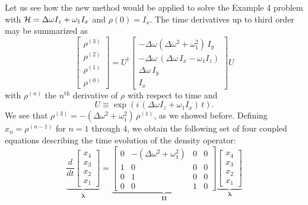 Let us see how the new method would be applied to solve the Example 4 problem with ${\cal H} = \Delta \omega I_z + \omega_1 I_x$ and $\rho(0) = I_x$.  The time derivatives up to third order may be summarized as
\begin{equation}
\begin{bmatrix}
	\rho^{(3)} \\
	\rho^{(2)} \\
	\rho^{(1)} \\
	\rho^{(0)} 
\end{bmatrix}
=
U^{\dagger}
\begin{bmatrix}
	- \Delta\omega (\Delta\omega^2 + \omega_1^2) \, I_y \\
	-\Delta\omega \, (\Delta\omega \, I_x - \omega_1 I_z)  \\
	\Delta \omega \, I_y \\
	I_x 
\end{bmatrix}
U
\end{equation}
with $\rho^{(n)}$ the $n^{\text{th}}$ derivative of $\rho$ with respect to time and
\begin{equation}
U \equiv \exp\!{\left( i \, (\Delta \omega I_z + \omega_1 I_x) \, t \right)}.
\end{equation}
We see that $\rho^{(3)} = - (\Delta\omega^2 + \omega_1^2) \, \rho^{(1)}$, as we showed before.  Defining $x_n = \rho^{(n-1)}$ for $n = 1$ through $4$, we obtain the following set of four coupled equations describing the time evolution of the density operator:
\begin{equation}
\underbrace{
\frac{d}{dt} 
	\begin{bmatrix} 
		x_4 \\ x_3 \\ x_2 \\ x_1 
	\end{bmatrix}}_{\dot{\bm{\lambda}}}
	= \underbrace{\begin{bmatrix} 
	    0 & -(\Delta\omega^2 + \omega_1^2) & 0 & 0 \\
	    1 & 0 & 0 & 0 \\
		0 & 1 & 0 & 0 \\
		0 & 0 & 1 & 0
	  \end{bmatrix}}_{\bm{\Omega}}
	  \underbrace{\begin{bmatrix} 
	  	x_4 \\ x_3 \\ x_2 \\ x_1
	   \end{bmatrix}}_{\bm{\lambda}}
\end{equation}
